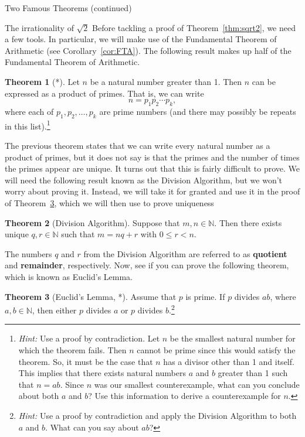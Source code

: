 \documentclass[11pt]{article}
\theoremstyle{definition}
\newtheorem{theorem}{Theorem}[section]
\begin{document}
\begin{section}{Two Famous Theorems (continued)}
\begin{subsection}{The irrationality of $\sqrt{2}$}
Before tackling a proof of Theorem~\ref{thm:sqrt2}, we need a few tools.  In particular, we will make use of the Fundamental Theorem of Arithmetic (see Corollary~\ref{cor:FTA}).  The following result makes up half of the Fundamental Theorem of Arithmetic.

\begin{theorem}[*]\label{thm:prodprimes}
Let $n$ be a natural number greater than 1.  Then $n$ can be expressed as a product of primes.  That is, we can write
\[
n=p_1 p_2 \cdots p_k,
\]
where each of $p_1, p_2, \ldots, p_k$ are prime numbers (and there may possibly be repeats in this list).\footnote{\emph{Hint:} Use a proof by contradiction.  Let $n$ be the smallest natural number for which the theorem fails.  Then $n$ cannot be prime since this would satisfy the theorem.  So, it must be the case that $n$ has a divisor other than 1 and itself.  This implies that there exists natural numbers $a$ and $b$ greater than 1 such that $n=ab$.  Since $n$ was our smallest counterexample, what can you conclude about both $a$ and $b$?  Use this information to derive a counterexample for $n$.}
\end{theorem}

The previous theorem states that we can write every natural number as a product of primes, but it does not say is that the primes and the number of times the primes appear are unique.  It turns out that this is fairly difficult to prove.  We will need the following result known as the Division Algorithm, but we won't worry about proving it.  Instead, we will take it for granted and use it in the proof of Theorem~\ref{thm:Euclid}, which we will then use to prove uniqueness

\begin{theorem}[Division Algorithm]
Suppose that $m,n\in\mathbb{N}$.  Then there exists unique $q,r\in\mathbb{N}$ such that $m=nq+r$ with $0\leq r<n$.
\end{theorem}
The numbers $q$ and $r$ from the Division Algorithm are referred to as \textbf{quotient} and \textbf{remainder}, respectively.  Now, see if you can prove the following theorem, which is known as Euclid's Lemma.

\begin{theorem}[Euclid's Lemma, *]\label{thm:Euclid}
Assume that $p$ is prime.  If $p$ divides $ab$, where $a,b\in\mathbb{N}$, then either $p$ divides $a$ or $p$ divides $b$.\footnote{\emph{Hint:} Use a proof by contradiction and apply the Division Algorithm to both $a$ and $b$.  What can you say about $ab$?}
\end{theorem}


\end{subsection}
\end{section}
\end{document}
